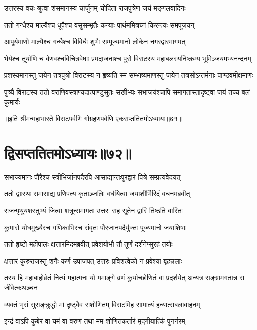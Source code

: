 
\twolineshloka
{उत्तरस्य वचः श्रुत्वा शंसमानस्य चार्जुनम्}
{चोदिता राजपुत्रेण जयं मङ्गलवादिनः}


\twolineshloka
{ततो गन्धैश्च माल्यैश्च धूपैश्च वसुसम्भृतैः}
{कन्याः पार्थममित्रघ्नं किरन्त्यः समपूजयन्}


\twolineshloka
{आपूर्यमाणो माल्यैश्च गन्धैश्च विविधैः शुभैः}
{सम्पूज्यमानो लोकेन नगरद्वारमागमत्}


\twolineshloka
{भेर्यश्च तूर्याणि च वेणवश्चविचित्रवेषाः प्रमदाजनाश्च}
{पुरो विराटस्य महाबलस्यनिष्क्रम्य भूमिञ्जयमभ्यनन्दनम्}


\twolineshloka
{प्रशस्यमानस्तु जयेन तत्रपुत्रो विराटस्य न हृष्यति स्म}
{सम्भाष्यमाणस्तु जयेन तत्रसोऽन्तर्मनाः पाण्डवमीक्षमाणः}


\twolineshloka
{पुत्र्यै विराटस्य ततो वराणिवस्त्राण्यदात्पाण्डुसुतः सखीभ्यः}
{सभाजयंश्चापि समागतास्तादृष्ट्वा जयं तच्च बलं कुमार्यः}

॥इति श्रीमन्महाभारते विराटपर्वणि गोग्रहणपर्वणि एकसप्ततितमोऽध्यायः॥७१॥

\chapter{द्विसप्ततितमोऽध्यायः॥७२॥}

\twolineshloka
{सभाज्यमानः पौरैश्च स्त्रीभिर्जानपदैरपि}
{आसाद्यान्तःपुरद्वारं पित्रे सम्प्रत्यवेदयत्}


\twolineshloka
{ततो द्वाःस्थः समासाद्य प्रणिपत्य कृताञ्जलिः}
{वर्धयित्वा जयाशीर्भिरिदं वचनमब्रवीत्}


\twolineshloka
{राजन्पृथुयशस्तुभ्यं जित्वा शत्रून्समागतः}
{उत्तरः सह सूतेन द्वारि तिष्ठति वारितः}


\twolineshloka
{कुमारो योधमुख्यैस्च गणिकाभिस्च संवृतः}
{पौरजानपदैर्युक्तः पूज्यमानो जयाशिषाः}


\twolineshloka
{ततो हृष्टो महीपालः क्षत्तारमिदमब्रवीत्}
{प्रवेशयोभौ तौ तूर्णं दर्शनेप्सुरहं तयोः}


\twolineshloka
{क्षत्तारं कुरुराजस्तु शनैः कर्ण उपाजपत्}
{उत्तरः प्रविशत्वेको न प्रवेश्या बृहन्नलाः}


\threelineshloka
{तस्य हि महाबाहोर्व्रतं नित्यं महात्मनः}
{यो ममाङ्गे व्रणं कुर्याच्छोणितं वा प्रदर्शयेत्}
{अन्यत्र सङ्ग्रामगतान्न स जीवेत्कथञ्चन}


\twolineshloka
{व्यक्तं भृसं सुसङ्क्रुद्धो मां दृष्ट्वैव सशोणितम्}
{विराटमिह सामात्यं हन्यात्सबलावाहनम्}


\twolineshloka
{इन्द्रं वाऽपि कुबेरं वा यमं वा वरुणं तथा}
{मम शोणितकर्तारं मृद्गीयात्किं पुनर्नरम्}


